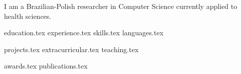\documentclass[letterpaper,11pt]{article}
\begin{document}
\newpage


\vspace{0.35cm}
{\justifying
I am a Brazilian-Polish researcher in Computer Science currently applied to health sciences.

}

{education.tex}
{experience.tex}
\sidebyside
    {{skills.tex}}
    {{languages.tex}}


{projects.tex}
{extracurricular.tex}
{teaching.tex}

{awards.tex}
{publications.tex}
\end{document}
